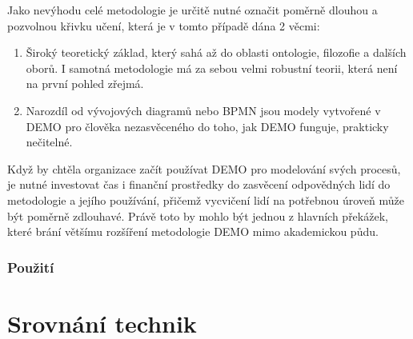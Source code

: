 \documentclass[]{article}
\begin{document}
Jako nevýhodu celé metodologie je určitě nutné označit poměrně dlouhou a pozvolnou křivku učení, která je v tomto případě dána 2 věcmi:

\begin{enumerate}
\item Široký teoretický základ, který sahá až do oblasti ontologie, filozofie a dalších oborů. I samotná metodologie má za sebou velmi robustní teorii, která není na první pohled zřejmá.
\item Narozdíl od vývojových diagramů nebo BPMN jsou modely vytvořené v DEMO pro člověka nezasvěceného do toho, jak DEMO funguje, prakticky nečitelné.
\end{enumerate}

Když by chtěla organizace začít používat DEMO pro modelování svých procesů, je nutné investovat čas i finanční prostředky do zasvěcení odpovědných lidí do metodologie a jejího používání, přičemž vycvičení lidí na potřebnou úroveň může být poměrně zdlouhavé. Právě toto by mohlo být jednou z hlavních překážek, které brání většímu rozšíření metodologie DEMO mimo akademickou půdu.

\subsubsection{Použití}


\section{Srovnání technik}

\nocite{*}


\end{document}
